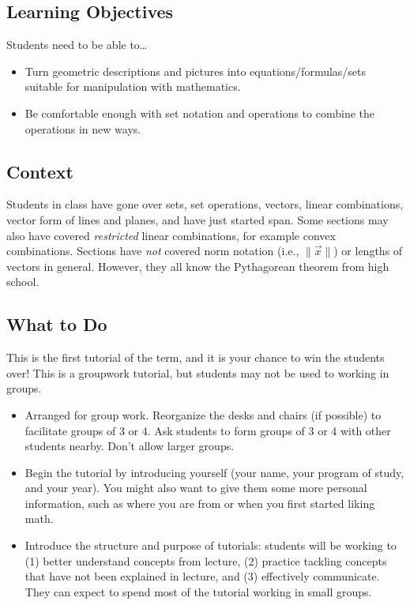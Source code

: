 \documentclass[red]{tutorial}
\theoremstyle{definition}
\theoremstyle{theorem}
\begin{document}
	\begin{instructions}

		\subsection*{Learning Objectives} Students need to be able to\ldots
		\begin{itemize}
			\item Turn geometric descriptions and pictures into equations/formulas/sets
				suitable for manipulation with mathematics.

			\item Be comfortable enough with set notation and operations to combine 
				the operations in new ways.
		\end{itemize}


		\subsection*{Context} Students in class have gone over sets, set operations,
		vectors, linear combinations, vector form of lines and planes, and have just started
		span. Some sections may also have covered \emph{restricted} linear combinations, for example
		convex combinations. Sections have \emph{not} covered norm notation (i.e., $\|\vec x\|$) or
		lengths of vectors in general. However, they all know the Pythagorean theorem from high school.


		\subsection*{What to Do} This is the first tutorial of the term, and
		it is your chance to win the students over! This is a groupwork tutorial,
		but students may not be used to working in groups. 

		\begin{itemize}
			\item Arranged for group work. Reorganize the desks and chairs
				(if possible) to facilitate groups of 3 or 4. Ask
				students to form groups of 3 or 4 with other students
				nearby. Don't allow larger groups.

			\item Begin the tutorial by introducing yourself (your name,
				your program of study, and your year). You might
				also want to give them some more personal information,
				such as where you are from or when you first started liking math.

			\item Introduce the structure and purpose of tutorials: students
				will be working to (1) better understand concepts
				from lecture, (2) practice tackling concepts that
				have not been explained in lecture, and (3) effectively
				communicate. They can expect to spend most of the
				tutorial working in small groups.


\end{itemize}
\end{instructions}
\end{document}
